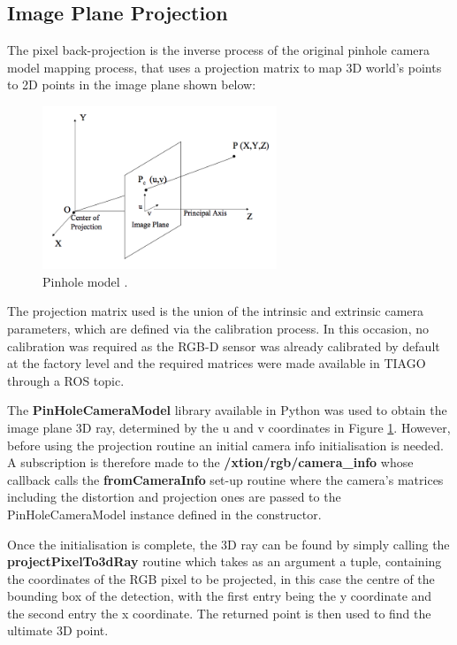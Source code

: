 \subsection{Image Plane Projection}

The pixel back-projection is the inverse process of the original pinhole camera model mapping process, that uses a projection matrix to map 3D world's points to 2D points in the image plane shown below:

\begin{figure}[!htbp]
  \begin{center}
    \includegraphics[width=7cm]{images/chapter4_pinhole_model.png}
  \end{center}
  \caption{Pinhole model \cite{website:majumder}.}
  \label{fig:pinhole}
\end{figure}

The projection matrix used is the union of the intrinsic and extrinsic camera parameters, which are defined via the calibration process. In this occasion, no calibration was required as the RGB-D sensor was already calibrated by default at the factory level and the required matrices were made available in TIAGO through a ROS topic.

The \textbf{PinHoleCameraModel} library available in Python was used to obtain the image plane 3D ray, determined by the u and v coordinates in Figure \ref{fig:pinhole}. However, before using the projection routine an initial camera info initialisation is needed. A subscription is therefore made to the \textbf{/xtion/rgb/camera\_info} whose callback calls the \textbf{fromCameraInfo} set-up routine where the camera's matrices including the distortion and projection ones are passed to the PinHoleCameraModel instance defined in the constructor.

Once the initialisation is complete, the 3D ray can be found by simply calling the \textbf{projectPixelTo3dRay} routine which takes as an argument a tuple, containing the coordinates of the RGB pixel to be projected, in this case the centre of the bounding box of the detection, with the first entry being the y coordinate and the second entry the x coordinate. The returned point is then used to find the ultimate 3D point.

